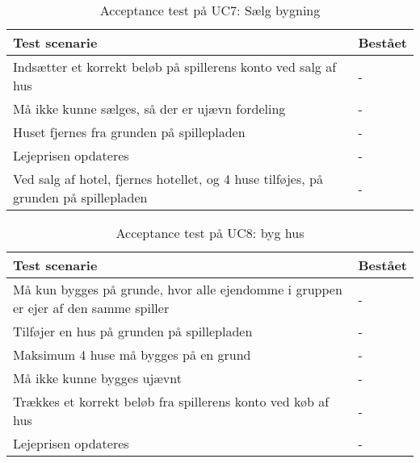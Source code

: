 \documentclass[class=article, crop=false]{standalone}
\begin{document}
    \begin{table}[H]
        \caption{Acceptance test på UC7: Sælg bygning }
        \begin{tabularx}{\textwidth}{|X|l|}
            \hline
            \textbf{Test scenarie}       & \textbf{Bestået}   \\ \hline
            Indsætter et korrekt beløb på spillerens konto ved salg af hus     & - \\ \hline
            Må ikke kunne sælges, så der er ujævn fordeling     & - \\ \hline
            Huset fjernes fra grunden på spillepladen     & - \\ \hline
            Lejeprisen opdateres     & -\\ \hline
            Ved salg af hotel, fjernes hotellet, og 4 huse tilføjes, på grunden på spillepladen    & - \\ \hline
        \end{tabularx}
    \end{table}

    \begin{table}[H]
        \caption{Acceptance test på UC8: byg hus}
        \begin{tabularx}{\textwidth}{|X|l|}
            \hline
            \textbf{Test scenarie}       & \textbf{Bestået}   \\ \hline
            Må kun bygges på grunde, hvor alle ejendomme i gruppen er ejer af den samme spiller     & - \\ \hline
            Tilføjer en hus på grunden på spillepladen     & -\\ \hline
            Maksimum 4 huse må bygges på en grund     & -\\ \hline
            Må ikke kunne bygges ujævnt     & -\\ \hline
            Trækkes et korrekt beløb fra spillerens konto ved køb af hus     & -\\ \hline
            Lejeprisen opdateres     & - \\ \hline
        \end{tabularx}
    \end{table}
\end{document}
